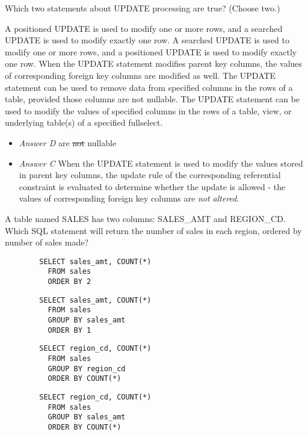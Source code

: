 \documentclass[answers, 11pt]{exam}
\begin{document}
\begin{questions}
\newpage
\question[1]
Which two statements about UPDATE processing are true? (Choose two.)
\begin{choices}
\choice A positioned UPDATE is used to modify one or more rows, and a searched UPDATE is used to 
modify exactly one row.
\CorrectChoice A searched UPDATE is used to modify one or more rows, and a positioned UPDATE is used to
modify exactly one row.
\choice When the UPDATE statement modifies parent key columns, the values of corresponding foreign key
columns are modified as well.
\choice The UPDATE statement can be used to remove data from specified columns in the rows of a table,
provided those columns are not nullable.
\CorrectChoice The UPDATE statement can be used to modify the values of specified columns in the rows
of a table, view, or underlying table(s) of a specified fullselect.
\end{choices} 

\begin{solution}
\begin{itemize}
\item \textit{Answer D} are \sout{not} nullable
\item \textit{Answer C} When the UPDATE statement is used to modify the values stored in parent key 
columns, the update rule of the corresponding referential constraint is evaluated to determine whether
the update is allowed - the values of corresponding foreign key columns are \textit{not altered}.
\end{itemize}
\end{solution}

\question[1]
A table named SALES has two columns: SALES\_AMT and REGION\_CD. Which SQL statement will return the number
of sales in each region, ordered by number of sales made?
\begin{choices}
\choice \begin{verbatim}
		SELECT sales_amt, COUNT(*)
		  FROM sales
		  ORDER BY 2
	 	\end{verbatim}
\choice \begin{verbatim}
		SELECT sales_amt, COUNT(*)
		  FROM sales
		  GROUP BY sales_amt
		  ORDER BY 1
		\end{verbatim}
\CorrectChoice \begin{verbatim}
		SELECT region_cd, COUNT(*)
		  FROM sales
		  GROUP BY region_cd
		  ORDER BY COUNT(*)
		\end{verbatim}
\choice \begin{verbatim}
		SELECT region_cd, COUNT(*)
		  FROM sales
		  GROUP BY sales_amt
		  ORDER BY COUNT(*)
		\end{verbatim}
\end{choices}


\end{questions}
\end{document}

